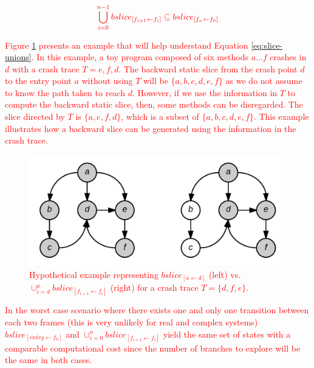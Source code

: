 \documentclass[times, doublespace]{smrauth}
\newcommand{\red}[1]{\textcolor{red}{#1}}
\begin{document}
{\begin{equation}
\centering
\begin{split}
  \red{
\bigcup_{i=0}^{n-1} bslice_{[f_{i+1} \leftarrow f_i]} \subseteq bslice_{[f_n \leftarrow f_0]}
  }
\end{split}
\label{eq:slice-unions}
\end{equation}

\red{Figure \ref{fig:jcharming-slice} presents an example that will help understand Equation \ref{eq:slice-unions}.
In this example, a toy program composed of six methods $a...f$ crashes in $d$ with a crash trace $T = {e, f, d}$.
The backward static slice from the crash point $d$ to the entry point $a$ without using $T$ will be $\{a, b, c, d, e, f\}$ as we do not assume to know the path taken to reach $d$.
However, if we use the information in $T$ to compute the backward static slice, then, some methods can be disregarded. The slice directed by $T$ is $\{a, e, f, d\}$, which is a subset of $\{a, b, c, d, e, f\}$. This example illustrates how a backward slice can be generated using the information in the crash trace. }

\begin{figure}
  \centering
    \includegraphics[scale=0.25]{media/jcharming-slices.png}
    \caption{\red{Hypothetical example representing $bslice_{[a \leftarrow d]}$ (left) vs. $\cup_{i=d}^{a} bslice_{[f_{i+1} \leftarrow f_i]}$ (right) for a crash trace $T=\{d, f, e\}$.
    \label{fig:jcharming-slice}}}
\end{figure}

\red{In the worst case scenario where there exists one and only one
transition between each two frames (this is very unlikely for real
and complex systems) $bslice_{[entry \leftarrow f_0]}$ and
 $\cup_{i=0}^n bslice_{[f_{i+1} \leftarrow f_i]}$ yield the same set of states with a
comparable computational cost since the number of branches
to explore will be the same in both cases.}


}
\end{document}
